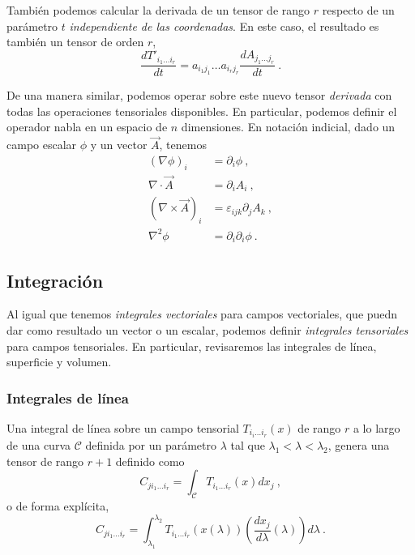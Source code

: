 También podemos calcular la derivada de un tensor de rango $r$ respecto de un parámetro $t$ \emph{independiente de las coordenadas}. En este caso, el resultado es también un tensor de orden $r$,
\begin{equation}
    \frac{d T'_{i_1 \dots i_r}}{dt} = a_{i_1 j_1} \dots a_{i_r j_r} \frac{dA_{j_1 \dots j_r}}{dt} \ . 
\end{equation}

De una manera similar, podemos operar sobre este nuevo tensor \emph{derivada} con todas las operaciones tensoriales disponibles. En particular, podemos definir el operador nabla en un espacio de $n$ dimensiones. En notación indicial, dado un campo escalar $\phi$ y un vector $\vec{A}$, tenemos
\begin{align}
    (\nabla \phi)_i & = \partial_i \phi \ , \\
    \nabla \cdot \vec{A} & = \partial_i A_i \ , \\
    (\nabla \times \vec{A})_i & = \varepsilon_{ijk} \partial_j A_k \ , \\
    \nabla^2 \phi & = \partial_i \partial_i \phi \ .
\end{align}

\subsection{Integración}

Al igual que tenemos \emph{integrales vectoriales} para campos vectoriales, que puedn dar como resultado un vector o un escalar, podemos definir \emph{integrales tensoriales} para campos tensoriales. En particular, revisaremos las integrales de línea, superficie y volumen.

\subsubsection*{Integrales de línea}

Una integral de línea sobre un campo tensorial $T_{i_i \dots i_r}(x)$ de rango $r$ a lo largo de una curva $\mathcal{C}$ definida por un parámetro $\lambda$ tal que $\lambda_1 < \lambda < \lambda_2$, genera una tensor de rango $r+1$ definido como
\begin{equation}
    C_{j i_1 \dots i_r} = \int_{\mathcal{C}} T_{i_1 \dots i_r} (x) dx_j \ ,
\end{equation}
o de forma explícita,
\begin{equation}
    C_{j i_1 \dots i_r} =  \int_{\lambda_1}^{\lambda_2} T_{i_1 \dots i_r}(x(\lambda)) \left(\frac{dx_j}{d\lambda}(\lambda) \right) d\lambda \ .
\end{equation}

